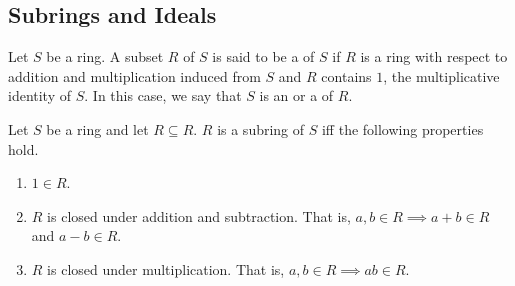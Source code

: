 \begin{comment}
\begin{defn}
   A polynomial that has a single term with coefficient $1$, of the form $x_1^{i_1} \cdots x_n^{i_n}$ is called a \deff{monomial}.
\end{defn}

With this, we may think of a polynomial as a finite $R$-linear combination of monomials. That is, a finite linear combination of monomials with coefficients in the commutative ring $R$. Moreover, addition and multiplication of any two such polynomials is defined in the natural way, as was defined in the single variable case. With this, we have the following.

\begin{prop}
    Let $R$ be a commutative ring and let $R[x_1, \ldots, x_n]$ denote the set of all polynomials in $n$ variables, $x_1, \ldots, x_n$, with coefficients in $R$. Then, $R[x_1, \ldots, x_n]$ forms a commutative ring.
\end{prop}

For convenience, we define and use the following notation henceforth. 

\underline{Multi-index notation}: For any $\alpha = (\alpha_1, \ldots, \alpha_n) \in \N^n$, we define
\[
    \mathbf{x}^{\alpha} \vcentcolon= x_1^{\alpha_1} \cdots x_n^{\alpha_n}
\]
and we define $\alpha \vcentcolon= \deg \mathbf{x}^{\alpha} = \alpha_1 + \ldots + \alpha_n$.

With this notation, any polynomial in $R[x_1, \ldots, x_n]$ may be succinctly written as
\[
    \sum_{\alpha \, \in \, \Lambda} a_{\alpha} \mathbf{x}^{\alpha}
\]
where $\Lambda$ is a finite subset of $\N^n$. Of course, we may define $a_{\alpha}$ to be $0$ when $\alpha \notin \Lambda$ and then allow $\alpha$ to vary freely over $\N^n$ in the sum above.

\end{comment}

\subsection{Subrings and Ideals}

\begin{defn}[Subring]
    Let $S$ be a ring. A subset $R$ of $S$ is said to be a  of $S$ if $R$ is a ring with respect to addition and multiplication induced from $S$ and $R$ contains $1$, the multiplicative identity of $S$. In this case, we say that $S$ is an  or a  of $R$.
\end{defn}
\begin{prop}
    Let $S$ be a ring and let $R \subseteq R$. $R$ is a subring of $S$ iff the following properties hold.
    \begin{enumerate}
        \item $1 \in R$.
        \item $R$ is closed under addition and subtraction. That is, $a,b \in R \implies a+b \in R$ and $a-b \in R$.
        \item $R$ is closed under multiplication. That is, $a,b \in R \implies ab \in R$.
    \end{enumerate}
\end{prop} 

